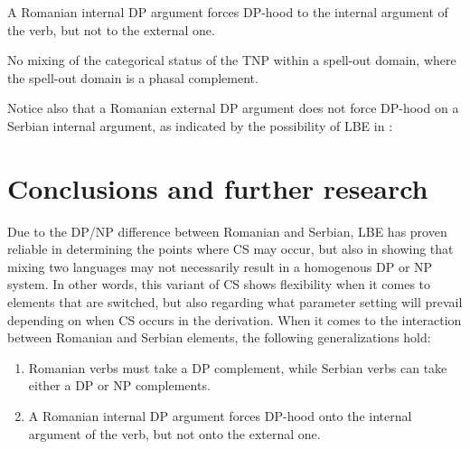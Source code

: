 \documentclass[output=paper,
hidelinks,
newtxmath,
]{langscibook}
\begin{document}
\ea\label{ex31}
  A Romanian internal DP argument forces DP-hood to the internal argument of the verb, but not to the external one.
\z

\ea\label{ex32}
  No mixing of the categorical status of the TNP within a spell-out domain, where the spell-out domain is a phasal complement.
\z

\noindent Notice also that a Romanian external DP argument does not force DP-hood on a Serbian internal argument, as indicated by the possibility of LBE in :

\ea \label{ex33}
	\z
\z

\section{Conclusions and further research}\label{s6}

Due to the DP/NP difference between Romanian and Serbian, LBE has proven reliable in determining the points where CS may occur, but also in showing that mixing two languages may not necessarily result in a homogenous DP or NP system. In other words, this variant of CS shows flexibility when it comes to elements that are switched, but also regarding what parameter setting will prevail depending on when CS occurs in the derivation. When it comes to the interaction between Romanian and Serbian elements, the following generalizations hold:

\begin{enumerate}
    \item Romanian verbs must take a DP complement, while Serbian verbs can take either a DP or NP complements.
    \item A Romanian internal DP argument forces DP-hood onto the internal argument of the verb, but not onto the external one.
\end{enumerate}
\end{document}

